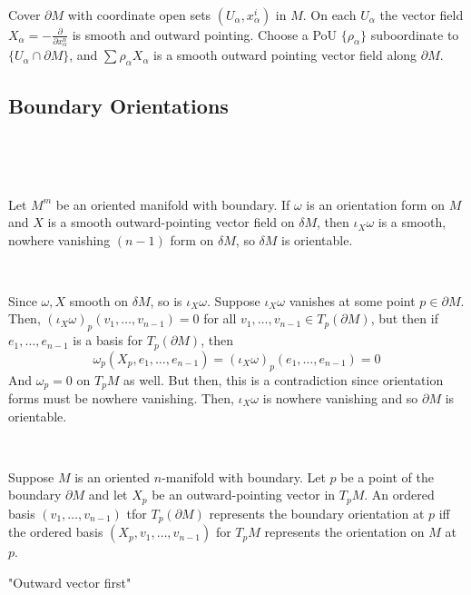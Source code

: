 \documentclass{article}
\begin{document}
\begin{customproof}
  \

  Cover $\partial M$ with coordinate open sets $(U_\alpha, x^i_\alpha)$ in $M$. On each $U_\alpha$ the vector field $X_\alpha = -\frac{\partial}{\partial x^n_\alpha}$ is smooth and outward pointing. Choose a PoU $\{\rho_\alpha\}$ suboordinate to $\{U_\alpha \cap \partial M\}$, and $\sum \rho_\alpha X_\alpha$ is a smooth outward pointing vector field along $\partial M$.
\end{customproof}

\subsection{Boundary Orientations}
\

\begin{proposition}
  \

  Let $M^m$ be an oriented manifold with boundary. If $\omega$ is an orientation form on $M$ and $X$ is a smooth outward-pointing vector field on $\delta M$, then $\iota_X \omega$ is a smooth, nowhere vanishing $(n-1)$ form on $\delta M$, so $\delta M$ is orientable.
\end{proposition}

\begin{customproof}
  \

  Since $\omega, X$ smooth on $\delta M$, so is $\iota_X \omega$. Suppose $\iota_X \omega$ vanishes at some point $p \in \partial M$. Then, $(\iota_X \omega)_p(v_1, \dots, v_{n-1}) = 0$ for all $v_1, \dots, v_{n-1} \in T_p(\partial M)$, but then if $e_1, \dots, e_{n-1}$ is a basis for $T_p(\partial M)$, then $$\omega_p(X_p, e_1, \dots, e_{n-1}) = (\iota_X \omega)_p(e_1, \dots, e_{n-1}) = 0$$And $\omega_p = 0$ on $T_pM$ as well. But then, this is a contradiction since orientation forms must be nowhere vanishing. Then, $\iota_X \omega$ is nowhere vanishing and so $\partial M$ is orientable.
\end{customproof}

\begin{proposition}
  \

  Suppose $M$ is an oriented $n$-manifold with boundary. Let $p$ be a point of the boundary $\partial M$ and let $X_p$ be an outward-pointing vector in $T_pM$. An ordered basis $(v_1, \dots, v_{n-1})$ tfor $T_p(\partial M)$ represents the boundary orientation at $p$ iff the ordered basis $(X_p, v_1, \dots, v_{n-1})$ for $T_pM$ represents the orientation on $M$ at $p$.

  "Outward vector first"
\end{proposition}
\end{document}

